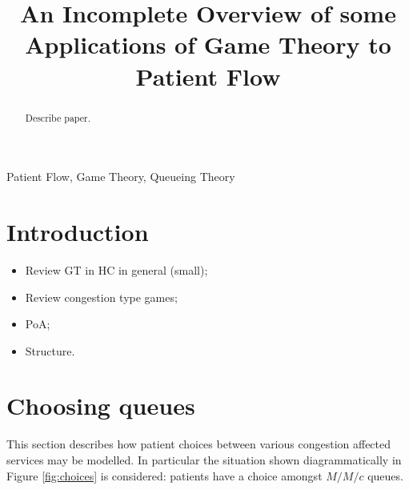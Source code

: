 \documentclass[a4paper,11pt]{article}
\title{An Incomplete Overview of some Applications of Game Theory to Patient Flow}
\begin{document}
\maketitle

\author{
}

\author{
}

\author{
}

\author{
}

\author{
}

\vspace{8mm}

\begin{abstract}
Describe paper.
\end{abstract}

\bigskip
\begin{keywords}
Patient Flow, Game Theory, Queueing Theory

\bigskip
{}
\end{keywords}


\newpage

\section{Introduction}

\begin{itemize}
    \item Review GT in HC in general (small);
    \item Review congestion type games;
    \item PoA;
    \item Structure.
\end{itemize}

\section{Choosing queues}

This section describes how patient choices between various congestion affected services may be modelled.
In particular the situation shown diagrammatically in Figure \ref{fig:choices} is considered: patients have a choice amongst $M/M/c$ queues.
\end{document}
